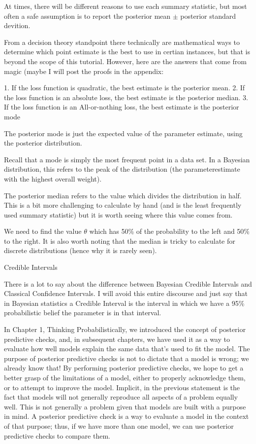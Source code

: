At times, there will be different reasons to use each summary statistic, but most often a safe assumption is to report the posterior mean $\pm$ posterior standard devition.

From a decision theory standpoint there technically are mathematical ways to determine which point estimate is the best to use in certian instances, but that is beyond the scope of this tutorial. However, here are the answers that come from magic (maybe I will post the proofs in the appendix:

1. If the loss function is quadratic, the best estimate is the posterior mean.
2. If the loss function is an absolute loss, the best estimate is the posterior median.
3. If the loss function is an All-or-nothing loss, the best estimate is the posterior mode

The posterior mode is just the expected value of the parameter estimate, using the posterior distribution.

Recall that a mode is simply the most frequent point in a data set. In a Bayesian distribution, this refers to the peak of the distribution (the parameterestimate with the highest overall weight). 

The posterior median refers to the value which divides the distribution in half. This is a bit more challenging to calculate by hand (and is the least frequently used summary statistic) but it is worth seeing where this value comes from.

We need to find the value $\theta$ which has 50\% of the probability to the left and 50\% to the right. It is also worth noting that the median is tricky to calculate for discrete distributions (hence why it is rarely seen).


Credible Intervals

There is a lot to say about the difference between Bayesian Credible Intervals and Classical Confidence Intervals. I will avoid this entire discourse and just say that in Bayesian statistics a Credible Interval is the interval in which we have a 95\% probabilistic belief the parameter is in that interval.

In Chapter 1, Thinking Probabilistically, we introduced the concept of posterior predictive checks, and, in subsequent chapters, we have used it as a way to evaluate how well models explain the same data that's used to fit the model. The purpose of posterior predictive checks is not to dictate that a model is wrong; we already know that! By performing posterior predictive checks, we hope to get a better grasp of the limitations of a model, either to properly acknowledge them, or to attempt to improve the model. Implicit, in the previous statement is the fact that models will not generally reproduce all aspects of a problem equally well. This is not generally a problem given that models are built with a purpose in mind. A posterior predictive check is a way to evaluate a model in the context of that purpose; thus, if we have more than one model, we can use posterior predictive checks to compare them.

